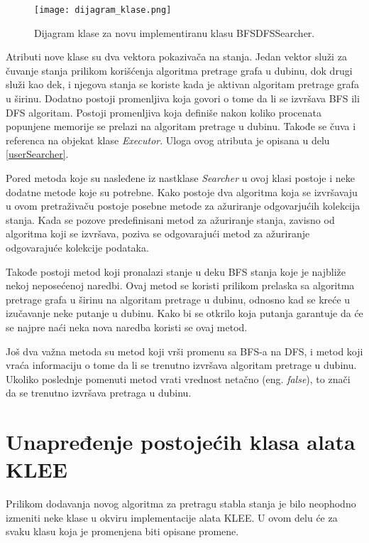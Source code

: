 \documentclass[12pt,oneside]{memoir}
\begin{document}
\begin{figure}[ht]
    \centering
    \texttt{[image: dijagram\_klase.png]}
    \caption{Dijagram klase za novu implementiranu klasu BFSDFSSearcher.}
    \label{fig:UML}
\end{figure}

Atributi nove klase su dva vektora pokazivača na stanja. Jedan vektor služi za čuvanje stanja prilikom korišćenja algoritma pretrage grafa u dubinu, dok drugi služi kao dek, i njegova stanja se koriste kada je aktivan algoritam pretrage grafa u širinu. Dodatno postoji promenljiva koja govori o tome da li se izvršava BFS ili DFS algoritam. Postoji promenljiva koja definiše nakon koliko procenata popunjene memorije se prelazi na algoritam pretrage u dubinu. Takođe se čuva i referenca na objekat klase \textit{Executor}. Uloga ovog atributa je opisana u delu \ref{userSearcher}.

Pored metoda koje su nasleđene iz nastklase \textit{Searcher} u ovoj klasi postoje i neke dodatne metode koje su potrebne. Kako postoje dva algoritma koja se izvršavaju u ovom pretraživaču postoje posebne metode za ažuriranje odgovarjućih kolekcija stanja. Kada se pozove predefinisani metod za ažuriranje stanja, zavisno od algoritma koji se izvršava, poziva se odgovarajući metod za ažuriranje odgovarajuće kolekcije podataka. 

Takođe postoji metod koji pronalazi stanje u deku BFS stanja koje je najbliže nekoj neposećenoj naredbi. Ovaj metod se koristi prilikom prelaska sa algoritma pretrage grafa u širinu na algoritam pretrage u dubinu, odnosno kad se kreće u izučavanje neke putanje u dubinu. Kako bi se otkrilo koja putanja garantuje da će se najpre naći neka nova naredba koristi se ovaj metod. 

Još dva važna metoda su metod koji vrši promenu sa BFS-a na DFS, i metod koji vraća informaciju o tome da li se trenutno izvršava algoritam pretrage u dubinu. Ukoliko poslednje pomenuti metod vrati vrednost netačno (eng. \textit{false}), to znači da se trenutno izvršava pretraga u dubinu.

\section{Unapređenje postojećih klasa alata KLEE} \label{izmene}
Prilikom dodavanja novog algoritma za pretragu stabla stanja je bilo neophodno izmeniti neke klase u okviru implementacije alata KLEE. U ovom delu će za svaku klasu koja je promenjena biti opisane promene.
\end{document}
